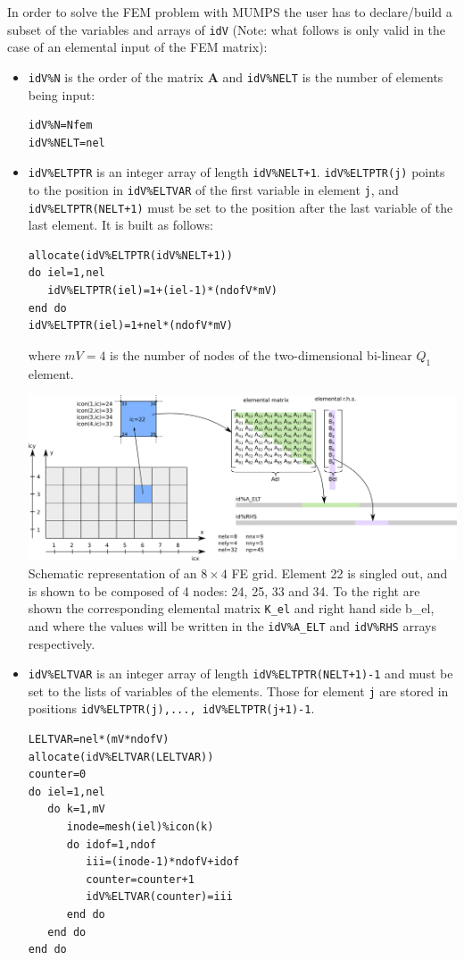 In order to solve the FEM problem with MUMPS the user has to declare/build 
a subset of the variables and arrays of {\tt idV} (Note: what follows is only valid in 
the case of an elemental input of the FEM matrix):
\begin{itemize}
\item {\tt idV\%N} is the order of the matrix ${\bm A}$
and {\tt idV\%NELT} is the number of elements being input:
\begin{verbatim}
idV%N=Nfem    
idV%NELT=nel
\end{verbatim}

\item {\tt idV\%ELTPTR} is an integer array of 
length {\tt idV\%NELT+1}. {\tt idV\%ELTPTR(j)} points to the position in {\tt idV\%ELTVAR}
of the first variable in element {\tt j}, and {\tt idV\%ELTPTR(NELT+1)} must be set to 
the position after the last variable of the last element. It is built as follows: 

\begin{lstlisting}
allocate(idV%ELTPTR(idV%NELT+1))
do iel=1,nel                         
   idV%ELTPTR(iel)=1+(iel-1)*(ndofV*mV)   
end do                         
idV%ELTPTR(iel)=1+nel*(ndofV*mV) 
\end{lstlisting}
where $mV=4$ is the number of nodes of the two-dimensional bi-linear $Q_1$ element.

\begin{center}
\includegraphics[width=16cm]{images/MUMPS/grid}\\
{\captionfont Schematic representation of an $8\times4$ FE grid. 
Element 22 is singled out, and is shown to
be composed of 4 nodes: 24, 25, 33 and 34. To the right are shown the corresponding elemental
matrix {\tt K\_el} and right hand side {b\_el}, and where the values will be written in the
{\tt idV\%A\_ELT} and {\tt idV\%RHS} arrays respectively.}
\end{center}


\item {\tt idV\%ELTVAR} is an integer array of length {\tt idV\%ELTPTR(NELT+1)-1} and must 
be set to the lists of variables of the elements. 
Those for element {\tt j} are stored in positions {\tt idV\%ELTPTR(j),..., idV\%ELTPTR(j+1)-1}. 
\begin{verbatim}
LELTVAR=nel*(mV*ndofV)  
allocate(idV%ELTVAR(LELTVAR))
counter=0   
do iel=1,nel 
   do k=1,mV    
      inode=mesh(iel)%icon(k)  
      do idof=1,ndof    
         iii=(inode-1)*ndofV+idof   
         counter=counter+1         
         idV%ELTVAR(counter)=iii   
      end do                   
   end do                 
end do               
\end{verbatim}



\end{itemize}
